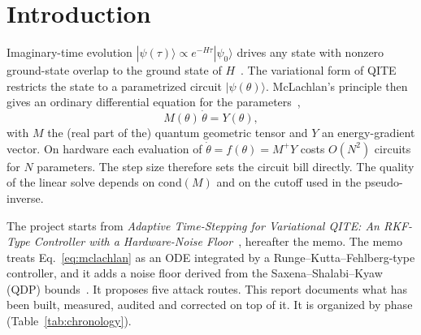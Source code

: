 \documentclass[aps,pra,reprint,superscriptaddress,nofootinbib]{revtex4-2}
\newcommand{\thetadot}{\dot\theta}
\newcommand{\cond}{\mathrm{cond}}
\begin{document}
\section{Introduction}
\label{sec:intro}

Imaginary-time evolution $|\psi(\tau)\rangle\propto e^{-H\tau}|\psi_0\rangle$ drives any state
with nonzero ground-state overlap to the ground state of $H$~\cite{Motta2020,Arulandu2026}. The variational form of QITE
restricts the state to a parametrized circuit $|\psi(\theta)\rangle$. McLachlan's principle
then gives an ordinary differential equation for the parameters~\cite{McArdle2019,QDP2024,Angles2025},
\begin{equation}
  M(\theta)\,\thetadot = Y(\theta),
  \label{eq:mclachlan}
\end{equation}
with $M$ the (real part of the) quantum geometric tensor and $Y$ an energy-gradient vector.
On hardware each evaluation of $\thetadot=f(\theta)=M^{+}Y$ costs $O(N^2)$ circuits for $N$
parameters. The step size therefore sets the circuit bill directly. The quality of the
linear solve depends on $\cond(M)$ and on the cutoff used in the pseudo-inverse.

The project starts from \emph{Adaptive Time-Stepping for
Variational QITE: An RKF-Type Controller with a Hardware-Noise Floor}~\cite{Memo}, hereafter the memo.
The memo treats Eq.~\eqref{eq:mclachlan} as an ODE integrated by a Runge--Kutta--Fehlberg-type
controller, and it adds a noise floor derived from the Saxena--Shalabi--Kyaw (QDP) bounds~\cite{QDP2024}.
It proposes five attack routes. This report documents what has been built, measured,
audited and corrected on top of it. It is organized by phase (Table~\ref{tab:chronology}).
\end{document}
